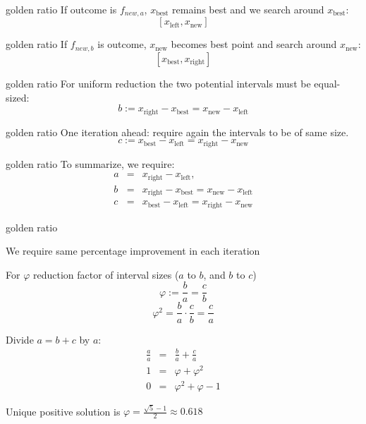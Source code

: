 \documentclass[11pt,compress,t,notes=noshow, xcolor=table]{beamer}
\newcommand{\xleft}{x_{\text{left}}} %
\newcommand{\xright}{x_{\text{right}}} %
\newcommand{\xnew}{x_{\text{new}}} %
\newcommand{\xbest}{x_{\text{best}}} %
\begin{document}
\begin{frame2}{golden ratio}
If outcome is $f_{new, a}$, $\xbest$ remains best and we search around $\xbest$: $$[\xleft, \xnew]$$
\vfill
{}
\end{frame2}

\begin{frame2}{golden ratio}
If $f_{new, b}$ is outcome, $\xnew$ becomes best point and search around $\xnew$: $$[\xbest, \xright]$$
\vfill
{}
\end{frame2}

\begin{frame2}{golden ratio}
For uniform reduction the two potential intervals must be equal-sized: 
\begin{equation*}
b := \xright - \xbest = \xnew - \xleft
\end{equation*}
\vfill
{}
\end{frame2}

\begin{frame2}{golden ratio}
One iteration ahead: require again the intervals to be of same size. 
$$c := \xbest - \xleft = \xright - \xnew$$
\vfill
{}
\end{frame2}

\begin{frame2}{golden ratio}
To summarize, we require: 
\begin{eqnarray*}
a &=& \xright-\xleft, \\
b &=& \xright - \xbest = \xnew - \xleft \\
c &=& \xbest - \xleft = \xright - \xnew
\end{eqnarray*}
\vfill
{}
\end{frame2}

\begin{framei}{golden ratio}
\item We require same percentage improvement in each iteration
\item For $\varphi$ reduction factor of interval sizes ($a$ to $b$, and $b$ to $c$)
$$\varphi := \frac{b}{a} = \frac{c}{b}$$
$$\varphi^2 = \frac{b}{a} \cdot \frac{c}{b} = \frac{c}{a}$$
\item Divide $a = b + c$ by $a$:
\begin{eqnarray*}
\frac{a}{a} &=& \frac{b}{a} + \frac{c}{a} \\
1 &=& \varphi + \varphi^2 \\
0 &=& \varphi^2 + \varphi - 1
\end{eqnarray*}
\item Unique positive solution is $\varphi = \frac{\sqrt{5}-1}{2} \approx 0.618$
\end{framei}
\end{document}
